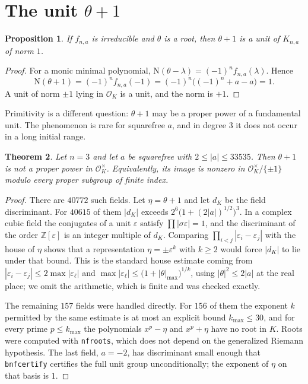 \documentclass[11pt]{article}
\newtheorem{theorem}{Theorem}
\newtheorem{proposition}[theorem]{Proposition}
\theoremstyle{definition}
\theoremstyle{remark}
\newcommand{\Z}{\mathbb{Z}}
\newcommand{\OK}{\mathcal{O}_K}
\newcommand{\Norm}{\mathrm{N}}
\begin{document}
\section{The unit $\theta+1$}\label{sec:unit}

\begin{proposition}\label{prop:unit}
If $f_{n,a}$ is irreducible and $\theta$ is a root, then $\theta+1$ is a unit of
$K_{n,a}$ of norm $1$.
\end{proposition}

\begin{proof}
For a monic minimal polynomial, $\Norm(\theta-\lambda)=(-1)^{n}f_{n,a}(\lambda)$.
Hence
\[
\Norm(\theta+1)=(-1)^{n}f_{n,a}(-1)
=(-1)^{n}\bigl((-1)^{n}+a-a\bigr)=1.
\]
A unit of norm $\pm 1$ lying in $\OK$ is a unit, and the norm is $+1$.
\end{proof}

Primitivity is a different question: $\theta+1$ may be a proper power of a
fundamental unit. The phenomenon is rare for squarefree $a$, and in degree $3$
it does not occur in a long initial range.

\begin{theorem}\label{thm:prim}
Let $n=3$ and let $a$ be squarefree with $2\le|a|\le 33535$. Then $\theta+1$ is not
a proper power in $\OK^{\times}$. Equivalently, its image is nonzero in
$\OK^{\times}/\{\pm 1\}$ modulo every proper subgroup of finite index.
\end{theorem}

\begin{proof}
There are $40772$ such fields. Let $\eta=\theta+1$ and let $d_K$ be the field
discriminant. For $40615$ of them $|d_K|$ exceeds
$2^{6}\bigl(1+(2|a|)^{1/2}\bigr)^{3}$. In a complex cubic field the conjugates of
a unit $\varepsilon$ satisfy $\prod|\sigma\varepsilon|=1$, and the discriminant of
the order $\Z[\varepsilon]$ is an integer multiple of $d_K$. Comparing
$\prod_{i<j}|\varepsilon_i-\varepsilon_j|$ with the house of $\eta$ shows that a
representation $\eta=\pm\varepsilon^{k}$ with $k\ge 2$ would force $|d_K|$ to lie
under that bound. This is the standard house estimate coming from
$|\varepsilon_i-\varepsilon_j|\le 2\max|\varepsilon_\ell|$ and
$\max|\varepsilon_\ell|\le\bigl(1+|\theta|_{\max}\bigr)^{1/k}$, using
$|\theta|^{2}\le 2|a|$ at the real place; we omit the arithmetic, which is finite
and was checked exactly.

The remaining $157$ fields were handled directly. For $156$ of them the exponent
$k$ permitted by the same estimate is at most an explicit bound $k_{\max}\le 30$,
and for every prime $p\le k_{\max}$ the polynomials $x^{p}-\eta$ and
$x^{p}+\eta$ have no root in $K$. Roots were computed with \texttt{nfroots}, which
does not depend on the generalized Riemann hypothesis. The last field, $a=-2$,
has discriminant small enough that \texttt{bnfcertify} certifies the full unit
group unconditionally; the exponent of $\eta$ on that basis is $1$.
\end{proof}
\end{document}
